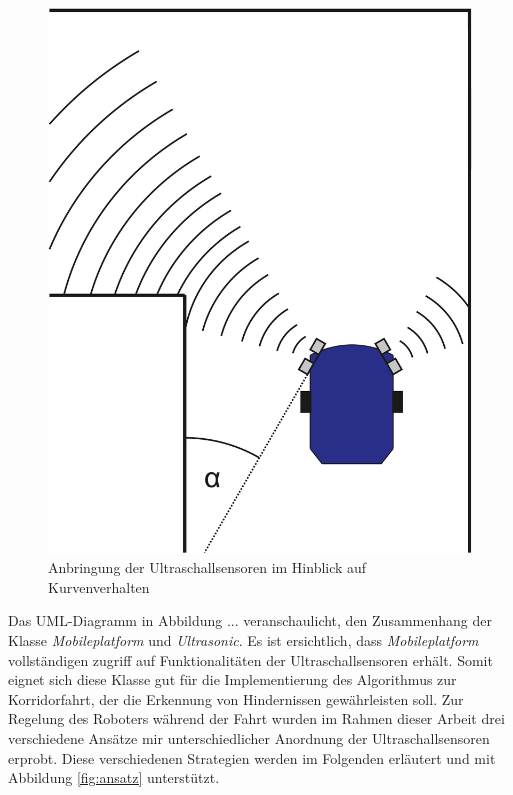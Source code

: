 \documentclass[12pt,a4paper,oneside]{article}
\begin{document}
\begin{spacing}{1.15}
\begin{figure}[!htb]
	\centering
	\includegraphics[scale=.3]{figs/kurve}
	\caption{Anbringung der Ultraschallsensoren im Hinblick auf Kurvenverhalten}
	\label{fig:kurve}
\end{figure}

Das UML-Diagramm in Abbildung ... veranschaulicht, den Zusammenhang der Klasse \textit{Mobileplatform} und \textit{Ultrasonic}. Es ist ersichtlich, dass \textit{Mobileplatform} vollständigen zugriff auf Funktionalitäten der Ultraschallsensoren erhält. Somit eignet sich diese Klasse gut für die Implementierung des Algorithmus zur Korridorfahrt, der die Erkennung von Hindernissen gewährleisten soll. Zur Regelung des Roboters während der Fahrt wurden im Rahmen dieser Arbeit drei verschiedene Ansätze mir unterschiedlicher Anordnung der Ultraschallsensoren erprobt. Diese verschiedenen Strategien werden im Folgenden erläutert und mit Abbildung \ref{fig:ansatz} unterstützt.


\end{spacing}
\end{document}

